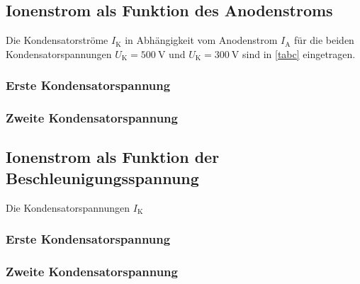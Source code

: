 

\subsection{Ionenstrom als Funktion des Anodenstroms}

Die Kondensatorströme $I_\text{K}$ in Abhängigkeit vom
Anodenstrom $I_\text{A}$ für die beiden Kondensatorspannungen
$U_\text{K} = \SI{500}{\volt}$ und $U_\text{K} = \SI{300}{\volt}$
sind in \ref{tabc} eingetragen.

\subsubsection{Erste Kondensatorspannung}

\subsubsection{Zweite Kondensatorspannung}


\subsection{Ionenstrom als Funktion der Beschleunigungsspannung}



Die Kondensatorspannungen $I_\text{K}$

\subsubsection{Erste Kondensatorspannung}

\subsubsection{Zweite Kondensatorspannung}
